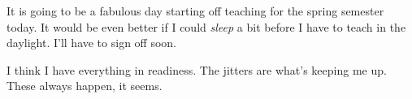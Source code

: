 It is going to be a fabulous day starting off teaching for the spring
semester today. It would be even better if I could \emph{sleep} a bit
before I have to teach in the daylight. I'll have to sign off soon.

I think I have everything in readiness. The jitters are what's keeping
me up. These always happen, it seems.
